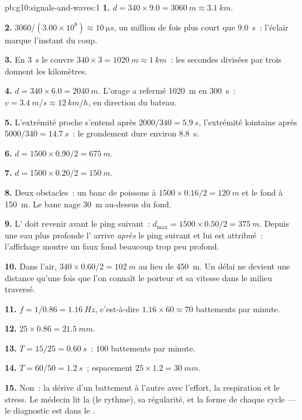 \begin{solution}{pb:g10:signals-and-waves:1}
\textbf{1.} $d = 340 \times 9.0 = \qty{3060}{m} \approx \qty{3.1}{km}$.

\textbf{2.} $3060/(3.00\times10^{8}) \approx \qty{10}{\micro s}$, un
million de fois plus court que \qty{9.0}{s}~: l'éclair marque l'instant
du coup.

\textbf{3.} En \qty{3}{s} le  couvre $340 \times 3 =
\qty{1020}{m} \approx \qty{1}{km}$~: les secondes divisées par trois
donnent les kilomètres.

\textbf{4.} $d = 340 \times 6.0 = \qty{2040}{m}$. L'orage a refermé
\qty{1020}{m} en \qty{300}{s}~: $v = \qty{3.4}{m/s} \approx
\qty{12}{km/h}$, en direction du bateau.

\textbf{5.} L'extrémité proche s'entend après $2000/340 = \qty{5.9}{s}$,
l'extrémité lointaine après $5000/340 = \qty{14.7}{s}$~: le grondement
dure environ \qty{8.8}{s}.

\textbf{6.} $d = 1500 \times 0.90/2 = \qty{675}{m}$.

\textbf{7.} $d = 1500 \times 0.20/2 = \qty{150}{m}$.

\textbf{8.} Deux obstacles~: un banc de poissons à $1500 \times 0.16/2 =
\qty{120}{m}$ et le fond à \qty{150}{m}. Le banc nage \qty{30}{m}
au-dessus du fond.

\textbf{9.} L' doit revenir avant le ping suivant~:
$d_{\max} = 1500 \times 0.50/2 = \qty{375}{m}$. Depuis une eau plus
profonde l' arrive \emph{après} le ping suivant et lui
est attribué~: l'affichage montre un faux fond beaucoup trop peu
profond.

\textbf{10.} Dans l'air, $340 \times 0.60/2 = \qty{102}{m}$ au lieu de
\qty{450}{m}. Un délai ne devient une distance qu'une fois que l'on
connaît le porteur et sa vitesse dans le milieu traversé.

\textbf{11.} $f = 1/0.86 = \qty{1.16}{Hz}$, c'est-à-dire
$1.16 \times 60 \approx 70$ battements par minute.

\textbf{12.} $25 \times 0.86 = \qty{21.5}{mm}$.

\textbf{13.} $T = 15/25 = \qty{0.60}{s}$~: $100$ battements par minute.

\textbf{14.} $T = 60/50 = \qty{1.2}{s}$~; espacement
$25 \times 1.2 = \qty{30}{mm}$.

\textbf{15.} Non~: la  dérive d'un battement à
l'autre avec l'effort, la respiration et le stress. Le médecin lit la
 (le rythme), sa régularité, et la forme de chaque
cycle --- le diagnostic est dans le .


\end{solution}
